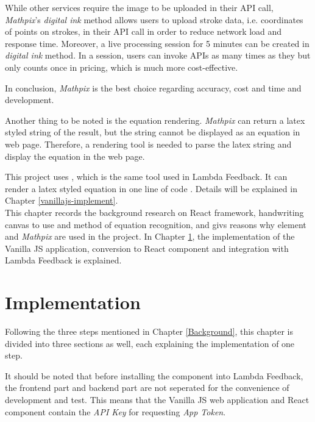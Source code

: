 \documentclass[12pt,twoside]{report}
\begin{document}
While other services require the image to be uploaded in their API call,
\textit{Mathpix}'s \textit{digital ink} method allows users to upload stroke
data, i.e. coordinates of points on strokes, in their API call in order to
reduce network load and response time. Moreover, a live processing session for 5
minutes can be created in \textit{digital ink} method. In a session, users can
invoke APIs as many times as they but only counts once in pricing, which is much
more cost-effective.

In conclusion, \textit{Mathpix} is the best choice regarding accuracy, cost and time and development.

Another thing to be noted is the equation rendering. \textit{Mathpix} can return a latex styled string of the result, but the string cannot be displayed as an equation in web page. Therefore, a rendering tool is needed to parse the latex string and display the equation in the web page. 

This project uses , which is the same tool used in Lambda Feedback. It can render a latex styled equation in one line of code \cite{web:katexapi}. Details will be explained in Chapter \ref{vanillajs-implement}.
\\

This chapter records the background research on React framework, handwriting canvas to use and method of equation recognition, and givs reasons why  element and \textit{Mathpix} are used in the project. In Chapter \ref{Implementation}, the implementation of the Vanilla JS application, conversion to React component and integration with Lambda Feedback is explained.



\chapter{Implementation}
\label{Implementation}

Following the three steps mentioned in Chapter \ref{Background}, this chapter is divided into three sections as well, each explaining the implementation of one step.

It should be noted that before installing the component into Lambda Feedback, the frontend part and backend part are not seperated for the convenience of development and test. This means that the Vanilla JS web application and React component contain the \textit{API Key} for requesting \textit{App Token}.
\end{document}
